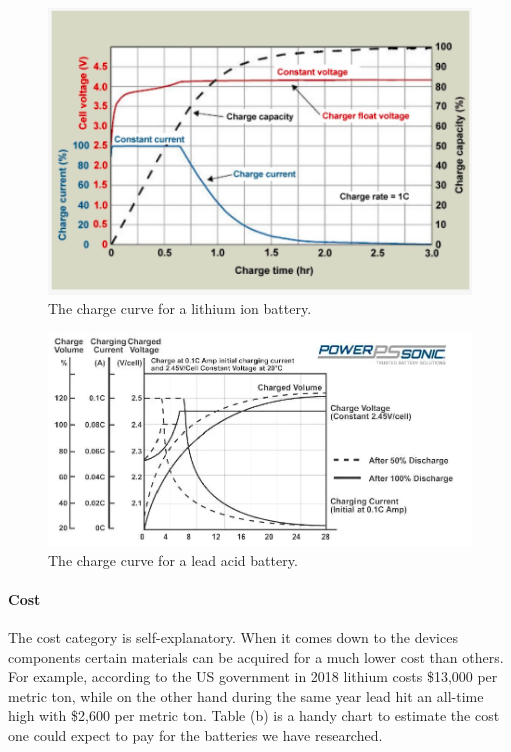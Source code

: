 \begin{figure}
    \centering
    \includegraphics[scale=0.5]{figures/lithium charge curve.png}
    \caption{The charge curve for a lithium ion battery.}
    \label{fig:lithium-charge-curve} 
\end{figure}

\begin{figure}
    \centering
    \includegraphics[scale=0.5]{figures/lead acid charge curve.png}
    \caption{The charge curve for a lead acid battery.}
    \label{fig:lead-acid-charge-curve} 
\end{figure}
\paragraph{Cost}
The cost category is self-explanatory. When it comes down to the devices components certain materials can be acquired for a much lower cost than others. For example, according to the US government in 2018 lithium costs \$13,000 per metric ton, while on the other hand during the same year lead hit an all-time high with \$2,600 per metric ton. Table (b) is a handy chart to estimate the cost one could expect to pay for the batteries we have researched. 

